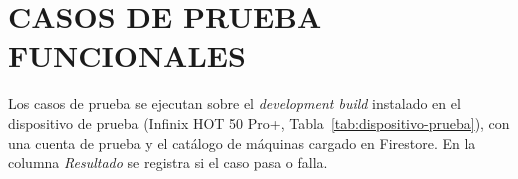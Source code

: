\chapter{CASOS DE PRUEBA FUNCIONALES}
\label{anx:casos}

Los casos de prueba se ejecutan sobre el \emph{development build} instalado
en el dispositivo de prueba (Infinix HOT 50 Pro+,
Tabla~\ref{tab:dispositivo-prueba}), con una cuenta de prueba y el catálogo de máquinas
cargado en Firestore. En la columna \emph{Resultado} se registra si el caso
pasa o falla.

\newcommand{\cpres}{\textcolor{black!45}{\scriptsize\shortstack[l]{$\square$ Pasa\\$\square$ Falla}}}

